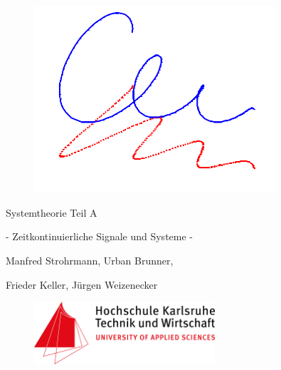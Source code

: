 \begin{figure}[H]
  \centerline{\includegraphics[width=0.8\textwidth]{Syslogo.PNG}}
\end{figure}

\noindent \bigskip

\centerline  {\fontsize{40}{50}\selectfont Systemtheorie Teil A} 

\noindent \medskip

\centerline  {\fontsize{20}{20}\selectfont  - Zeitkontinuierliche Signale und Systeme -}

\noindent \bigskip
\noindent \bigskip
\noindent \bigskip
\noindent \bigskip

\centerline  {\fontsize{20}{20}\selectfont  Manfred Strohrmann, Urban Brunner,}\medskip

\noindent 

\centerline  {\fontsize{20}{20}\selectfont Frieder Keller, Jürgen Weizenecker}
\vspace{4.0\baselineskip}

\begin{figure}[H]
  \centerline{\includegraphics[width=0.6\textwidth]{FH_Logo.png}}
\end{figure}

\clearpage

\noindent
